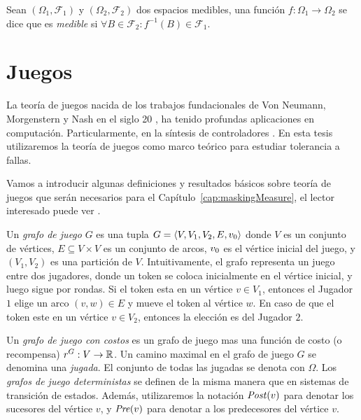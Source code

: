 Sean $(\Omega_1,\mathcal{F}_1)$ y $(\Omega_2,\mathcal{F}_2)$ dos espacios medibles, una función $f:\Omega_1 \rightarrow \Omega_2$ se dice que es \emph{medible} si $\forall B \in \mathcal{F}_2 : f^{-1}(B) \in \mathcal{F}_1$.

\section{Juegos}
La teoría de juegos nacida de los trabajos fundacionales de Von Neumann, Morgenstern y Nash en el siglo 20 \cite{MorgensternNeuman42, Nash50}, ha tenido profundas aplicaciones en computación. Particularmente, en la síntesis de controladores \cite{DBLP:conf/iccps/FengWHT15, DBLP:conf/ifipTCS/BolligC04}. En esta tesis utilizaremos la teoría de juegos como marco teórico para estudiar tolerancia a fallas.

Vamos a introducir algunas definiciones y resultados básicos sobre teoría de juegos que serán necesarios para el Capítulo~\ref{cap:maskingMeasure}, el lector interesado puede ver \cite{AptG11}.

Un \emph{grafo de juego} $G$ es una tupla $G = \langle V, V_1, V_2, E, v_0 \rangle$ donde $V$ es un conjunto de vértices, $E\subseteq V \times V$ es un conjunto de arcos, $v_0$ es el vértice inicial del juego, y $(V_1, V_2)$ es una partición de $V$. Intuitivamente, el grafo representa un juego entre dos jugadores, donde un token se coloca inicialmente en el vértice inicial, y luego sigue por rondas. Si el token esta en un vértice $v \in V_1$, entonces el Jugador $1$ elige un arco $(v, w) \in E$ y mueve el token al vértice $w$. En caso de que el token este en un vértice $v \in V_2$, entonces la elección es del Jugador $2$.

Un \emph{grafo de juego con costos} es un grafo de juego mas una función de costo (o recompensa) $\mathit{r}^G:V \rightarrow \mathbb{R}$. Un camino maximal en el grafo de juego $G$ se denomina una \emph{jugada}. El conjunto de todas las jugadas se denota con $\Omega$. Los \emph{grafos de juego deterministas} se definen de la misma manera que en sistemas de transición de estados. Además, utilizaremos la notación $\mathit{Post}(v)$ para denotar los sucesores del vértice $v$, y $\mathit{Pre}(v)$ para denotar a los predecesores del vértice $v$.

